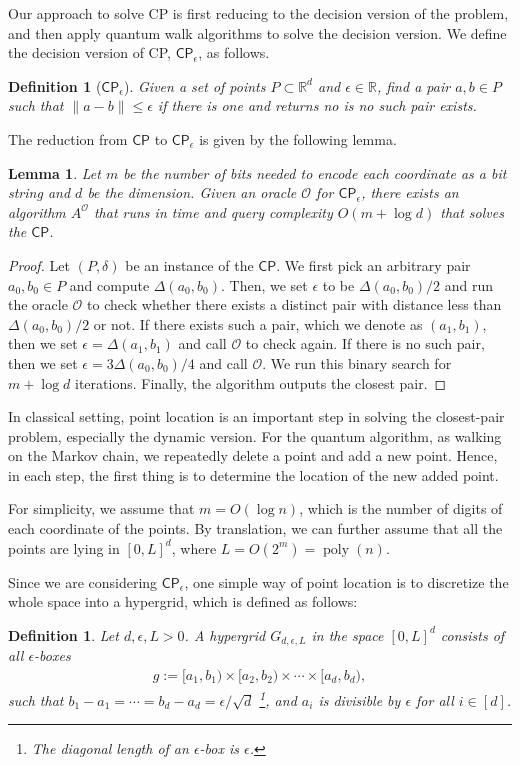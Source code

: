\documentclass[10pt,a4paper]{article}
\newtheorem{lemma}[theorem]{Lemma}
\newtheorem{definition}[theorem]{Definition}
\newcommand{\eps}{\epsilon}
\renewcommand{\eps}{\epsilon}
\DeclareMathOperator{\poly}{poly}
\newcommand{\ora}{\mathcal{O}}
\newcommand{\CP}{\ensuremath{\mathsf{CP}}}
\newcommand{\eCP}{\mathsf{CP}_{\epsilon}}
\begin{document}
Our approach to solve \textsf{CP} is first  reducing to the decision version of the problem, and then apply quantum walk algorithms to solve the decision version. We define the decision version of \textsf{CP},  $\eCP$, as follows. 
\begin{definition}[$\eCP$]
Given a set of points $P\subset \mathbb{R}^{d}$ and $\epsilon\in \mathbb{R}$, find a pair $a,b\in P$ such that $\|a-b\|\leq \epsilon$ if there is one and returns \textsf{no} is no such pair exists. 
\end{definition}
The reduction from $\CP$ to $\eCP$ is given by the following lemma.
\begin{lemma}
  \label{lemma:cp-ecp}
Let $m$ be the number of bits needed to encode each coordinate as a bit string and $d$ be the dimension.
Given an oracle $\ora$ for $\eCP$, there exists an algorithm $A^{\ora}$  that runs in time and query complexity $O(m+\log d )$ that solves the $\CP$. 
\end{lemma}
\begin{proof}
Let $(P,\delta)$ be an instance of the $\CP$.  We first pick an arbitrary pair $a_0,b_0\in P$ and compute $\Delta(a_0,b_0)$. Then, we set $\epsilon$ to be $\Delta(a_0,b_0)/2$ and run the oracle $\ora$ to check whether there exists a distinct pair with distance less than $\Delta(a_0,b_0)/2$ or not. If there exists such a pair, which we denote as $(a_1,b_1)$, then we set $\epsilon=\Delta(a_1,b_1)$ and call $\ora$ to check again. If there is no such pair, then we set $\epsilon=3\Delta(a_0,b_0)/4$ and call $\ora$. We run this binary search for $m+\log d$ iterations. Finally, the algorithm outputs the closest pair.  
\end{proof}

In classical setting, point location is an important step in solving the closest-pair problem, especially the dynamic version. For the quantum algorithm, as walking on the Markov chain, we repeatedly delete a point and add a new point. Hence, in each step, the first thing is to determine the location of the new added point.    

For simplicity, we assume that $m=O(\log n)$, which is the number of digits of each coordinate of the points. By translation, we can further assume that all the points are lying in $[0,L]^d$, where $L=O(2^m) = \poly(n)$. 

Since we are considering $\eCP$, one simple way of point location is to discretize the whole space into a hypergrid, which is defined as follows: 

\begin{definition}\label{def:hypergrid}
Let $d, \epsilon, L>0$. A hypergrid $G_{d,\epsilon,L}$ in the space $[0,L]^d$ consists of all  $\eps$-boxes 
\begin{align}
    g := [a_1,b_1)\times [a_2,b_2)\times \cdots \times [a_d,b_d), 
\end{align}
such that
$b_1-a_1=\cdots =b_d-a_d=\epsilon/\sqrt{d}$ \footnote{The diagonal length of an $\eps$-box is $\epsilon$.}, and $a_i$ is divisible by $\epsilon$ for all $i\in [d]$. 
\end{definition}
\end{document}
